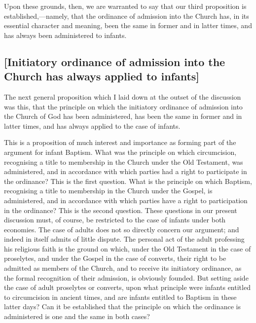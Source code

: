 \documentclass[
]{book}
\begin{document}
Upon these grounds, then, we are warranted to say that our third proposition is established,---namely, that the ordinance of admission into the Church has, in its essential character and meaning, been the same in former and in latter times, and has always been administered to infants.

\hypertarget{initiatory-ordinance-of-admission-into-the-church-has-always-applied-to-infants}{%
\subsection{{[}Initiatory ordinance of admission into the Church has always applied to infants{]}}\label{initiatory-ordinance-of-admission-into-the-church-has-always-applied-to-infants}}

The next general proposition which I laid down at the outset of the discussion was this, that the principle on which the initiatory ordinance of admission into the Church of God has been administered, has been the same in former and in latter times, and has always applied to the case of infants.

This is a proposition of much interest and importance as forming part of the argument for infant Baptism. What was the principle on which circumcision, recognising a title to membership in the Church under the Old Testament, was administered, and in accordance with which parties had a right to participate in the ordinance? This is the first question. What is the principle on which Baptism, recognising a title to membership in the Church under the Gospel, is administered, and in accordance with which parties have a right to participation in the ordinance? This is the second question. These questions in our present discussion must, of course, be restricted to the case of infants under both economies. The case of adults does not so directly concern our argument; and indeed in itself admits of little dispute. The personal act of the adult professing his religious faith is the ground on which, under the Old Testament in the case of proselytes, and under the Gospel in the case of converts, their right to be admitted as members of the Church, and to receive its initiatory ordinance, as the formal recognition of their admission, is obviously founded. But setting aside the case of adult proselytes or converts, upon what principle were infants entitled to circumcision in ancient times, and are infants entitled to Baptism in these latter days? Can it be established that the principle on which the ordinance is administered is one and the same in both cases?
\end{document}
